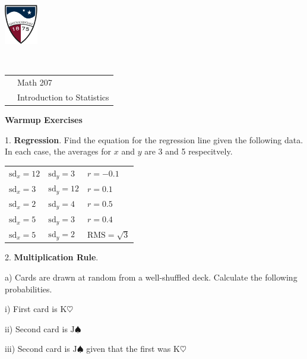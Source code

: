 \documentclass[10pt]{article}
\begin{document}
\pagestyle{empty}
\lstset{language=R, showspaces=false, showstringspaces=false}

\href{http://www.su.edu}{\includegraphics[height=1.75cm]{sulogo.eps}}
\vspace{-1.69cm}

{{\ }\hfill\small
\begin{tabular}{cl}
& Math 207\\
& Introduction to Statistics\\
\end{tabular}
}
\setlength{\baselineskip}{1.05\baselineskip}
\bigskip

\begin{center}
\textbf{\large  Warmup Exercises}
\end{center}
\medskip
\newcommand{\Z}{\hphantom{0}}

1. \textbf{Regression}. Find the equation for the regression line 
given the following data. In each case, the averages for $x$ and $y$ are
3 and 5 respecitvely.
\medskip

\begin{tabular}{lll}
$\mbox{sd}_x=12$ & $\mbox{sd}_y=3$ & $r=-0.1$\\[25pt]
$\mbox{sd}_x=3$ & $\mbox{sd}_y=12$ & $r=0.1$\\[25pt]
$\mbox{sd}_x=2$ & $\mbox{sd}_y=4$ & $r=0.5$\\[25pt]
$\mbox{sd}_x=5$ & $\mbox{sd}_y=3$ & $r=0.4$\\[25pt]
$\mbox{sd}_x=5$ & $\mbox{sd}_y=2$ & $\mbox{RMS}=\sqrt{3}$\\[25pt]
\end{tabular}
\bigskip

2. \textbf{Multiplication Rule}.  

\hspace{20pt} a)  Cards are drawn at random from a well-shuffled deck.
Calculate the following probabilities.
\medskip

\hspace{30pt} i) First card is $\mbox{K}\heartsuit$
\bigskip

\hspace{30pt} ii) Second card is $\mbox{J}\spadesuit$
\bigskip

\hspace{30pt} iii) Second card is $\mbox{J}\spadesuit$ given that 
the first was $\mbox{K}\heartsuit$
\bigskip
\end{document}
